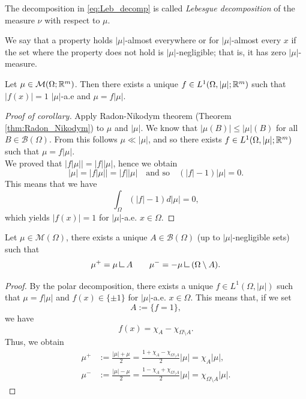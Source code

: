 The decomposition in \eqref{eq:Leb_decomp} is called {\em Lebesgue decomposition} of the measure $\nu$ with respect to $\mu$.

\begin{definition} We say that a property holds $|\mu|$-almost everywhere or for
$|\mu|$-almost every $x$ if the set where the property does not hold is
$|\mu|$-negligible; that is, it has zero $|\mu|$-measure.
\end{definition}

\begin{corollary}
Let $\mu \in \mathcal{M}(\Omega;\mathbb{R}^m)$. Then there exists a unique $f \in
L^1(\Omega,|\mu|;\mathbb{R}^m)$ such that $|f(x)| =1 $ $|\mu|$-a.e and $\mu = f|\mu|$.
\end{corollary}

\begin{proof}[Proof of corollary]
Apply Radon-Nikodym theorem (Theorem \ref{thm:Radon_Nikodym}) to $\mu$ and $|\mu|$. We know that 
\(
|\mu(B)| \leq |\mu|(B) 
\)
for all $B \in \mathcal{B}(\Omega)$. From this follows $\mu \ll |\mu|$, and so there exists $f \in L^{1}(\Omega, |\mu|; \mathbb{R}^{m})$ such that $\mu = f|\mu|$.
\\
We proved that $|f|\mu|| = |f||\mu|$, hence we obtain
\[
|\mu| = |f|\mu|| = |f||\mu|
\quad \text{and so} \quad
(|f| - 1)|\mu| = 0.
\]
This means that we have
\[
\int_{\Omega}(|f| - 1)d|\mu| = 0,
\]
which yields $|f(x)| =1$ for $|\mu|$-a.e. $x \in \Omega$. 
\end{proof}

\begin{corollary}
Let $\mu \in \mathcal{M}(\Omega)$, there exists a unique $A \in
\mathcal{B}(\Omega)$ (up to $|\mu|$-negligible sets) such that 
\[
\mu^+ = \mu \res A
\qquad 
\mu^- = -\mu \res (\Omega \setminus A).
\]
\end{corollary}
\begin{proof}
By the polar decomposition, there exists a unique $f \in L^{1}(\Omega, |\mu|)$ such that $\mu = f|\mu|$ and $f(x) \in \{\pm 1\}$ for
$|\mu|$-a.e. $x\in\Omega$. This means that, if we set
$$A:= \{f =1 \},$$
we have
\begin{equation*}
f(x) = \chi_A - \chi_{\Omega\setminus A}.
\end{equation*}
Thus, we obtain
\begin{align*}
\mu^+ & := \frac{|\mu| + \mu}{2} = \frac{ 1 + \chi_A - \chi_{\Omega\setminus A}}{2} |\mu| = \chi_{A} |\mu|, \\
\mu^- & := \frac{|\mu| - \mu}{2} = \frac{1 - \chi_{A} + \chi_{\Omega \setminus A}}{2} |\mu| = \chi_{\Omega \setminus A} |\mu|.
\end{align*}
\end{proof}

